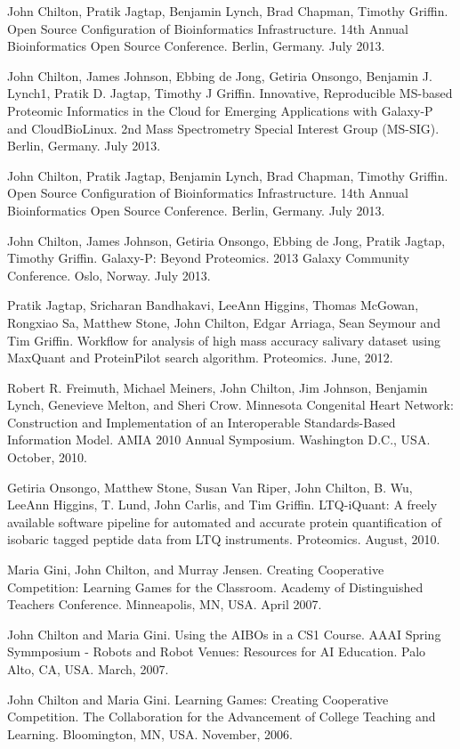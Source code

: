 \documentclass[margin,line]{res}
\begin{document}
\begin{resume}
{John Chilton, Pratik Jagtap, Benjamin Lynch, Brad Chapman, Timothy Griffin. Open Source Configuration of Bioinformatics Infrastructure. 14th Annual Bioinformatics Open Source Conference. Berlin, Germany. July 2013.

John Chilton, James Johnson, Ebbing de Jong, Getiria Onsongo, Benjamin J. Lynch1, Pratik D. Jagtap, Timothy J Griffin. Innovative, Reproducible MS-based Proteomic Informatics in the Cloud
for Emerging Applications with Galaxy-P and CloudBioLinux. 2nd Mass Spectrometry Special Interest Group (MS-SIG). Berlin, Germany. July 2013.

John Chilton, Pratik Jagtap, Benjamin Lynch, Brad Chapman, Timothy Griffin. Open Source Configuration of Bioinformatics Infrastructure. 14th Annual Bioinformatics Open Source Conference. Berlin, Germany. July 2013.

John Chilton, James Johnson, Getiria Onsongo, Ebbing de Jong, Pratik Jagtap, Timothy Griffin. Galaxy-P: Beyond Proteomics. 2013 Galaxy Community Conference. Oslo, Norway. July 2013.

Pratik Jagtap,  Sricharan Bandhakavi,  LeeAnn Higgins, Thomas McGowan,  Rongxiao Sa,  Matthew Stone, John Chilton, Edgar Arriaga, Sean Seymour and Tim Griffin. Workflow for analysis of high mass accuracy salivary dataset using MaxQuant and ProteinPilot search algorithm. Proteomics. June, 2012.

Robert R. Freimuth, Michael Meiners, John Chilton, Jim Johnson, Benjamin Lynch, Genevieve Melton, and Sheri Crow. Minnesota Congenital Heart Network: Construction and Implementation of an Interoperable Standards-Based Information Model. AMIA 2010 Annual Symposium. Washington D.C., USA. October, 2010.

Getiria Onsongo, Matthew Stone, Susan Van Riper, John Chilton, B. Wu, LeeAnn Higgins, T. Lund, John Carlis, and Tim Griffin. LTQ-iQuant: A freely available software pipeline for automated and accurate protein quantification of isobaric tagged peptide data from LTQ instruments. Proteomics. August, 2010.

Maria Gini, John Chilton, and Murray Jensen. Creating Cooperative Competition: Learning Games for the Classroom. Academy of Distinguished Teachers Conference. Minneapolis, MN, USA. April 2007.

John Chilton and Maria Gini. Using the AIBOs in a CS1 Course. AAAI Spring Symmposium - Robots and Robot Venues: Resources for AI Education. Palo Alto, CA, USA. March, 2007.

John Chilton and Maria Gini. Learning Games: Creating Cooperative Competition. The Collaboration for the Advancement of College Teaching and Learning. Bloomington, MN, USA. November, 2006.

}
\end{resume}
\end{document}

